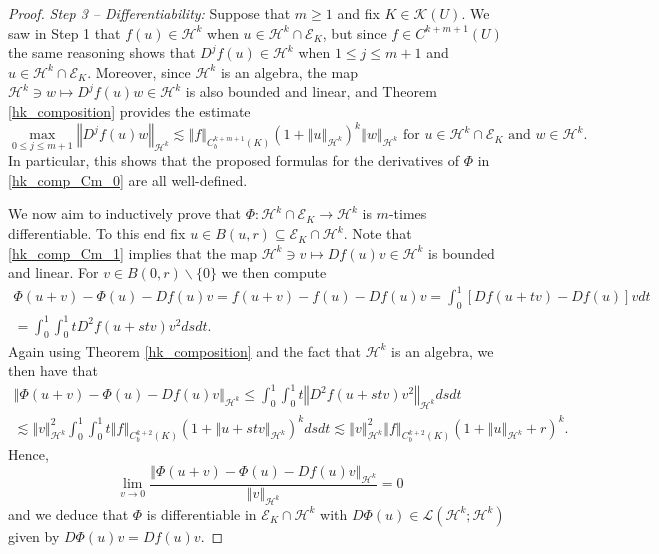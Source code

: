 \documentclass[11pt,reqno]{amsart}
\numberwithin{equation}{section}
\providecommand{\norm}[1]{\left\Vert#1\right\Vert}
\def\ls{\lesssim}
\providecommand{\norm}[1]{\left\Vert#1\right\Vert}
\def\ls{\lesssim}
\def\h{\mathcal{H}}
\def\L{\mathcal{L}}
\begin{document}
\begin{proof}
\emph{Step 3 -- Differentiability:}  Suppose that $m\ge 1$ and fix $K \in \mathcal{K}(U)$.   We saw in Step 1 that $f(u) \in \h^k$ when $u \in \h^k \cap \mathcal{E}_K$, but since $f \in C^{k+m+1}(U)$ the same reasoning shows that $D^j f(u) \in \h^k$ when $1 \le j \le m+1$ and $u \in \h^k \cap \mathcal{E}_K$.  Moreover, since $\h^k$ is an algebra, the map $\h^k \ni w \mapsto D^j f(u) w \in \h^k$ is also bounded and linear, and Theorem \ref{hk_composition} provides the estimate
\begin{equation}\label{hk_comp_Cm_1}
\max_{0\le j \le m+1} \norm{D^j f(u) w}_{\h^k} \ls \norm{f}_{C^{k+m+1}_b(K)}(1+\norm{u}_{\h^k})^k \norm{w}_{\h^k} \text{ for } u\in \h^k \cap \mathcal{E}_K \text{ and } w \in \h^k.
\end{equation}
In particular, this shows that the proposed formulas for the derivatives of $\Phi$ in \eqref{hk_comp_Cm_0} are all well-defined.

We now aim to inductively prove that $\Phi : \h^k \cap \mathcal{E}_K \to \h^k$ is $m$-times differentiable. To this end fix $u \in B(u,r) \subseteq \mathcal{E}_K \cap \h^k$.   Note that \eqref{hk_comp_Cm_1} implies that the map $\h^k \ni v \mapsto Df(u) v \in \h^k$ is bounded and linear. For $v \in B(0,r) \backslash \{0\}$ we then compute 
\begin{multline}
\Phi(u+v) - \Phi(u) - Df(u) v = f(u+v) - f(u) - Df(u) v = \int_0^1 [Df(u+tv) - Df(u)]v dt \\
= \int_0^1 \int_0^1 t D^2f(u+stv) v^2 ds dt. 
\end{multline}
Again using Theorem \ref{hk_composition} and the fact that $\h^k$ is an algebra, we then have that 
\begin{multline}
\norm{\Phi(u+v) - \Phi(u) - Df(u) v}_{\h^k} \le \int_0^1 \int_0^1 t \norm{D^2f(u+stv) v^2}_{\h^k} ds dt \\
\ls \norm{v}_{\h^k}^2 \int_0^1 \int_0^1 t \norm{f}_{C^{k+2}_b(K)}(1+ \norm{u+st v}_{\h^k} )^k dsdt 
\ls  \norm{v}_{\h^k}^2  \norm{f}_{C^{k+2}_b(K)} (1+ \norm{u}_{\h^k} + r)^k.
\end{multline}
Hence, 
\begin{equation}
 \lim_{v \to 0} \frac{\norm{\Phi(u+v) - \Phi(u) - Df(u) v}_{\h^k}}{\norm{v}_{\h^k}} =0
\end{equation}
and we deduce that $\Phi$ is differentiable in $\mathcal{E}_K \cap \h^k$ with $D\Phi(u) \in \L(\h^k;\h^k)$ given by $D\Phi(u)v = Df(u) v$.  


\end{proof}
\end{document}
